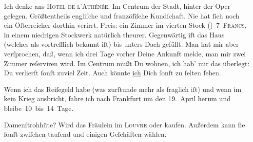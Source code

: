 \pstart
           Ich denke ans \textsc{Hotel de l’Athénée}. Im Centrum der Stadt,
               hinter der Oper gelegen.
               Größtentheils engliſche und franzöſiſche Kundſchaft. Nie hat
               ſich noch ein {\pb}Öſterreicher dorthin verirrt. Preis: ein Zimmer
               im vierten Stock (\label{K_L02807-2v}\label{K_L02807-2}) 7 \textsc{Francs}, in einem niedrigen Stockwerk natürlich theurer.
               Gegenwärtig iſt das Haus
               (welches als vortrefflich bekannt iſt) bis unters Dach gefüllt. Man hat mir aber
               verſprochen, daß, wenn ich drei Tage vorher Deine Ankunft melde, man mir zwei Zimmer
               reſerviren wird. Im Centrum
               mußt Du wohnen, ich hab’ mir das überlegt: Du verlierſt ſonſt zuviel Zeit. Auch
               könnte \uline{ich} Dich ſonſt zu ſelten ſehen.\pend
           
\pstart
           {\pb}Wenn ich das Reiſegeld habe (was zurſtunde mehr als
               fraglich iſt) und wenn im \label{K_L02807-3v}\label{K_L02807-3} kein Krieg ausbricht, fahre ich nach Frankfurt um den 19. April herum und
               bleibe 10 bis 14 Tage.\pend
           
\pstart
           Damenſtrohhüte? Wird  das Fräulein im \textsc{Louvre} oder \label{K_L02807-4v}\label{K_L02807-4} kaufen.  Außerdem kann ſie ſonſt zwiſchen
               tauſend und einigen Geſchäften wählen.\pend
           
